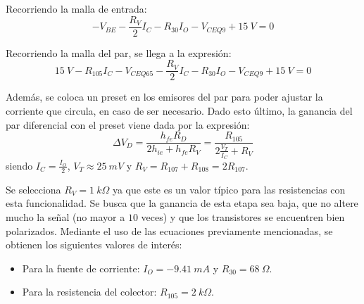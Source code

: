 Recorriendo la malla de entrada:
\begin{equation}
	- V_{BE} - \frac{R_V}{2} I_C - R_{30} I_O - V_{CEQ9} + 15 \ V = 0
\end{equation}

Recorriendo la malla del par, se llega a la expresión:
\begin{equation}
	15 \ V - R_{105} I_C - V_{CEQ65} - \frac{R_V}{2} I_C - R_{30} I_O - V_{CEQ9} + 15 \ V = 0
\end{equation}

Además, se coloca un preset en los emisores del par para poder ajustar la corriente que circula, en caso de ser necesario. Dado esto último, la ganancia del par diferencial con el preset viene dada por la expresión:
\begin{equation}
	\Delta V_D = \frac{h_{fe} R_D}{2 h_{ie} + h_{fe} R_V} = \frac{R_{105}}{2 \frac{V_T}{I_C} + R_V}
\end{equation}
siendo $I_C = \frac{I_O}{2}$, $V_T \approx 25 \ mV$ y $R_V = R_{107} + R_{108} = 2 R_{107} $.

Se selecciona $R_V = 1 \ k\Omega$ ya que este es un valor típico para las resistencias con esta funcionalidad. Se busca que la ganancia de esta etapa sea baja, que no altere mucho la señal (no mayor a $10$ veces) y que los transistores se encuentren bien polarizados. Mediante el uso de las ecuaciones previamente mencionadas, se obtienen los siguientes valores de interés:
\begin{itemize}
	\item Para la fuente de corriente: $I_O = -9.41 \ mA$ y $R_{30} = 68 \ \Omega$.
	\item Para la resistencia del colector: $R_{105} = 2 \ k\Omega$.
\end{itemize}